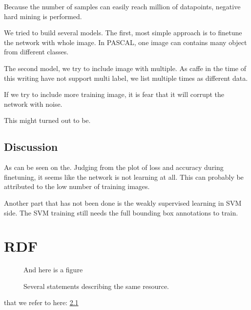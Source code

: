 \documentclass[a4paper,11pt]{kth-mag}
\begin{document}
Because the number of samples can easily reach million of datapoints, negative hard mining is performed.

We tried to build several models. The first, most simple approach is to finetune the network with whole image. In PASCAL, one image can contains many object from different classes.

The second model, we try to include image with multiple. As caffe in the time of this writing have not support multi label, we list multiple times as different data.

If we try to include more training image, it is fear that it will corrupt the network with noise.

This might turned out to be.

\section{Discussion}
As can be seen on the. Judging from the plot of loss and accuracy during finetuning, it seems like the network is not learning at all.
This can probably be attributed to the low number of training images.

Another part that has not been done is the weakly supervised learning in SVM side. The SVM training still needs the full bounding box annotations to train.




\appendix
\addappheadtotoc
\chapter{RDF}\label{appA}

\begin{figure}[ht]
\begin{center}
And here is a figure
\caption{\small{Several statements describing the same resource.}}\label{RDF_4}
\end{center}
\end{figure}

that we refer to here: \ref{RDF_4}
\end{document}
